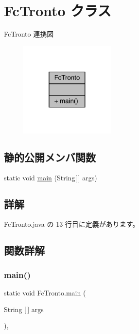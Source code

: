 \hypertarget{class_fc_tronto}{}\section{Fc\+Tronto クラス}
\label{class_fc_tronto}


Fc\+Tronto 連携図\nopagebreak
\begin{figure}[H]
\begin{center}
\leavevmode
\includegraphics[width=136pt]{d4/df1/class_fc_tronto__coll__graph}
\end{center}
\end{figure}
\subsection*{静的公開メンバ関数}
\begin{DoxyCompactItemize}
\item 
static void \mbox{\hyperlink{class_fc_tronto_a3e0328e996d4755d3624e9217c5848dc}{main}} (String\mbox{[}$\,$\mbox{]} args)
\end{DoxyCompactItemize}


\subsection{詳解}


 Fc\+Tronto.\+java の 13 行目に定義があります。



\subsection{関数詳解}
\mbox{\label{class_fc_tronto_a3e0328e996d4755d3624e9217c5848dc}} 
\subsubsection{\texorpdfstring{main()}{main()}}
{\footnotesize\ttfamily static void Fc\+Tronto.\+main (\begin{DoxyParamCaption}\item[{String \mbox{[}$\,$\mbox{]}}]{args }\end{DoxyParamCaption})\hspace{0.3cm}{\ttfamily [inline]}, {\ttfamily [static]}}



